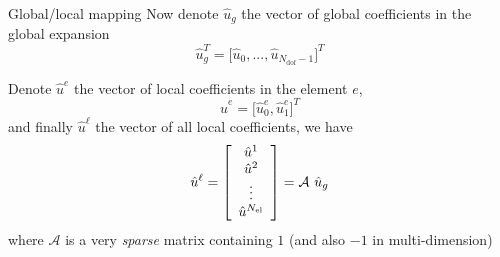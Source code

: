 \begin{frame}{Global/local mapping}
  Now denote $\hat{u}_g$ the vector of global coefficients in the global expansion
  \begin{equation}
    \label{eq:49}
    \hat{u}_g^T = \big[ \hat{u}_0, ..., \hat{u}_{N_{\text{dof}}-1} \big]^T
  \end{equation}
  
  Denote $\hat{u}^e$ the vector of local coefficients in the element $e$,
  \begin{equation}
    \label{eq:50}
    \hat{u}^e = \big[ \hat{u}^e_0, \hat{u}^e_1 \big]^T 
  \end{equation}
  and finally $\hat{u}^\ell$ the vector of all local coefficients, we have
  \begin{equation}
    \label{eq:51}
    \hat{u}^\ell = \left[
      \begin{array}[c]{c}
        \hat{u}^1\\
        \hat{u}^2\\
        \vdots\\
        \hat{u}^{N_\text{el}}
      \end{array} \right] 
    = \mathcal{A}\ \hat{u}_g
  \end{equation}
  where $\mathcal{A}$ is a very \emph{sparse} matrix containing $1$ (and also $-1$ in multi-dimension)
\end{frame}

